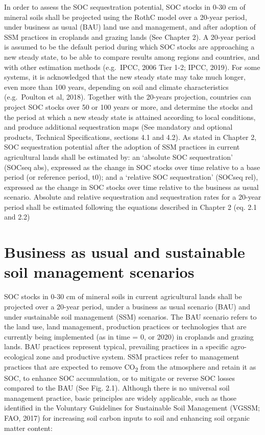 \documentclass[
  10pt,
  b5paper,
]{book}
\begin{document}
In order to assess the SOC sequestration potential, SOC stocks in 0-30 cm of mineral soils shall be projected using the RothC model over a 20-year period, under business as usual (BAU) land use and management, and after adoption of SSM practices in croplands and grazing lands (See Chapter 2). A 20-year period is assumed to be the default period during which SOC stocks are approaching a new steady state, to be able to compare results among regions and countries, and with other estimation methods (e.g.~IPCC, 2006 Tier 1-2; IPCC, 2019). For some systems, it is acknowledged that the new steady state may take much longer, even more than 100 years, depending on soil and climate characteristics (e.g.~Poulton et al, 2018). Together with the 20-years projection, countries can project SOC stocks over 50 or 100 years or more, and determine the stocks and the period at which a new steady state is attained according to local conditions, and produce additional sequestration maps (See mandatory and optional products, Technical Specifications, sections 4.1 and 4.2).
As stated in Chapter 2, SOC sequestration potential after the adoption of SSM practices in current agricultural lands shall be estimated by: an `absolute SOC sequestration' (SOCseq abs), expressed as the change in SOC stocks over time relative to a base period (or reference period, t0); and a `relative SOC sequestration' (SOCseq rel), expressed as the change in SOC stocks over time relative to the business as usual scenario. Absolute and relative sequestration and sequestration rates for a 20-year period shall be estimated following the equations described in Chapter 2 (eq. 2.1 and 2.2)

\hypertarget{business-as-usual-and-sustainable-soil-management-scenarios}{%
\section{Business as usual and sustainable soil management scenarios}\label{business-as-usual-and-sustainable-soil-management-scenarios}}

SOC stocks in 0-30 cm of mineral soils in current agricultural lands shall be projected over a 20-year period, under a business as usual scenario (BAU) and under sustainable soil management (SSM) scenarios. The BAU scenario refers to the land use, land management, production practices or technologies that are currently being implemented (as in time = 0, or 2020) in croplands and grazing lands. BAU practices represent typical, prevailing practices in a specific agro-ecological zone and productive system. SSM practices refer to management practices that are expected to remove CO\textsubscript{2} from the atmosphere and retain it as SOC, to enhance SOC accumulation, or to mitigate or reverse SOC losses compared to the BAU (See Fig. 2.1). Although there is no universal soil management practice, basic principles are widely applicable, such as those identified in the Voluntary Guidelines for Sustainable Soil Management (VGSSM; FAO, 2017) for increasing soil carbon inputs to soil and enhancing soil organic matter content:
\end{document}
